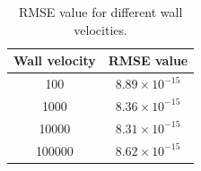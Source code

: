 %
%
\begin{table}[H]
\centering
\begin{tabular}{c | c}
     Wall velocity & RMSE value \\ \hline \hline
     100 & $8.89 \times 10^{-15}$ \\ \hline
     1000 & $8.36 \times 10^{-15}$ \\ \hline
     10000 & $8.31 \times 10^{-15}$ \\ \hline
     100000 & $8.62 \times 10^{-15}$ \\ \hline
\end{tabular}
\caption{RMSE value for different wall velocities.}
\label{table:C3_ghostCell_wallVelocity_RMSE}
\end{table}
%